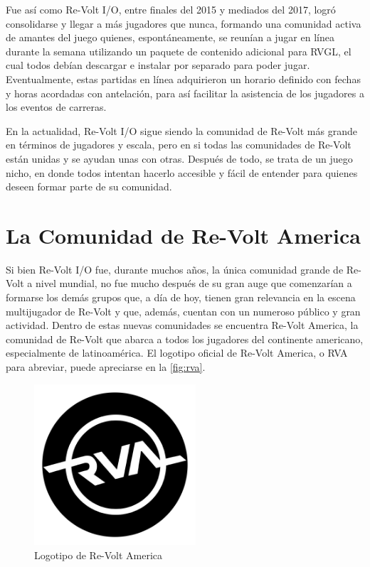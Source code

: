 Fue así como Re-Volt I/O, entre finales del 2015 y mediados del 2017, logró consolidarse y llegar a más jugadores que nunca, formando una comunidad activa de amantes del juego quienes, espontáneamente, se reunían a jugar en línea durante la semana utilizando un paquete de contenido adicional para RVGL, el cual todos debían descargar e instalar por separado para poder jugar. Eventualmente, estas partidas en línea adquirieron un horario definido con fechas y horas acordadas con antelación, para así facilitar la asistencia de los jugadores a los eventos de carreras.

En la actualidad, Re-Volt I/O sigue siendo la comunidad de Re-Volt más grande en términos de jugadores y escala, pero en si todas las comunidades de Re-Volt están unidas y se ayudan unas con otras. Después de todo, se trata de un juego nicho, en donde todos intentan hacerlo accesible y fácil de entender para quienes deseen formar parte de su comunidad.

\section{La Comunidad de Re-Volt America}
Si bien Re-Volt I/O fue, durante muchos años, la única comunidad grande de Re-Volt a nivel mundial, no fue mucho después de su gran auge que comenzarían a formarse los demás grupos que, a día de hoy, tienen gran relevancia en la escena multijugador de Re-Volt y que, además, cuentan con un numeroso público y gran actividad. Dentro de estas nuevas comunidades se encuentra Re-Volt America, la comunidad de Re-Volt que abarca a todos los jugadores del continente americano, especialmente de latinoamérica. El logotipo oficial de Re-Volt America, o RVA para abreviar, puede apreciarse en la \autoref{fig:rva}.

\begin{figure}[H]
  \begin{center}
    \includegraphics[width=6cm, height=6cm]{img/rva.png}
  \end{center}
  \caption[Logotipo de Re-Volt America]{Logotipo de Re-Volt America}
  \label{fig:rva}
\end{figure}

